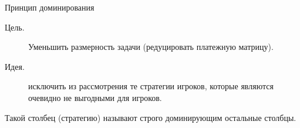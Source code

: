 \documentclass[unicode,11pt,notheorems,xcolor=table]{beamer}
\begin{document}
\begin{frame}{}{}

\end{frame}


\begin{frame}{Принцип доминирования}{}
    \begin{description}
        \item[Цель.] Уменьшить размерность задачи (редуцировать платежную матрицу).
        \item[Идея.] исключить из рассмотрения те стратегии игроков, которые являются очевидно не выгодными для игроков.
    \end{description}
    Такой столбец (стратегию) называют строго доминирующим остальные столбцы.

\end{frame}


\begin{frame}{}{}

\end{frame}


\begin{frame}{}{}

\end{frame}


\begin{frame}{}{}

\end{frame}


\begin{frame}{}{}

\end{frame}


\begin{frame}{}{}

\end{frame}


\begin{frame}{}{}

\end{frame}


\begin{frame}{}{}

\end{frame}


\begin{frame}{}{}

\end{frame}


\begin{frame}{}{}

\end{frame}


\begin{frame}{}{}

\end{frame}


\begin{frame}{}{}

\end{frame}
\end{document}
